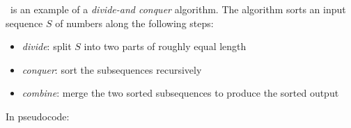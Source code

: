 %
%
%
%

\pagestyle{headandfoot}
\runningfootrule
{}
\runningheader{}{}{}
\firstpagefooter{}{}{}

\begin{questions}

\question
\mergesort\ is an example of a {\em divide-and conquer} algorithm. The algorithm
sorts an input sequence $S$ of numbers along the following steps:
%
\begin{itemize}
\item {\em divide}: split $S$ into two parts of roughly equal length
\item {\em conquer}: sort the subsequences recursively
\item {\em combine}: merge the two sorted subsequences to produce the sorted output
\end{itemize}
%
In pseudocode:
%
\begin{center}
  \begin{minipage}{.5\linewidth}
    \begin{algorithm}[H]
      \label{alg:merge-sort}
%
      \dontprintsemicolon
      \setalcaphskip{0ex}
%
      \caption{\mergesort($S$, $p$, $r$)}
      \vspace{.5em}
%
%
      \vspace{.5em}
%
    \end{algorithm}
  \end{minipage}
\end{center}
%
\end{questions}
